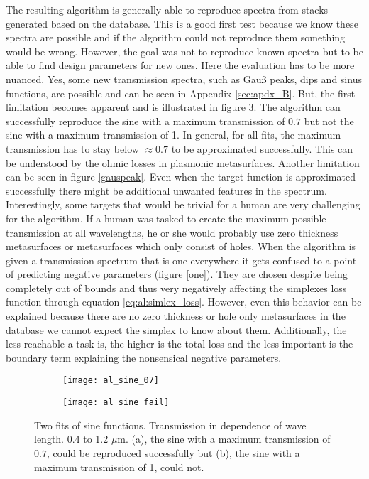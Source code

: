 The resulting algorithm is generally able to reproduce spectra from stacks generated based on the database.
This is a good first test because we know these spectra are possible and if the algorithm could not reproduce them something would be wrong. However, the goal was not to reproduce known spectra but to be able to find design parameters for new ones. Here the evaluation has to be more nuanced. Yes, some new transmission spectra, such as Gauß peaks, dips and sinus functions, are possible and can be seen in Appendix \ref{sec:apdx_B}.
But, the first limitation becomes apparent and is illustrated in figure \ref{fig:al:sine}.
The algorithm can successfully reproduce the sine with a maximum transmission of $0.7$ but not the sine with a maximum transmission of 1.
In general, for all fits, the maximum transmission has to stay below $\approx 0.7$ to be approximated successfully. This can be understood by the ohmic losses in plasmonic metasurfaces. Another limitation can be seen in figure \ref{gauspeak}. Even when the target function is approximated successfully there might be additional unwanted features in the spectrum. 
\\

\indent
Interestingly, some targets that would be trivial for a human are very challenging for the algorithm. If a human was tasked to create the maximum possible transmission at all wavelengths, he or she would probably use zero thickness metasurfaces or metasurfaces which only consist of holes. When the algorithm is given a transmission spectrum that is one everywhere it gets confused to a point of predicting negative parameters (figure \ref{one}).
They are chosen despite being completely out of bounds and thus very negatively affecting the simplexes loss function through equation \eqref{eq:al:simlex_loss}.
However, even this behavior can be explained because there are no zero thickness or hole only metasurfaces in the database we cannot expect the simplex to know about them.
Additionally, the less reachable a task is, the higher is the total loss and the less important is the boundary term explaining the nonsensical negative parameters.

\begin{figure}[H]
\centering
\begin{subfigure}{.5\textwidth}
    \centering
    \texttt{[image: al\_sine\_07]}
    \caption{}
    \label{fig:al:sine_succ}
\end{subfigure}%
\begin{subfigure}{.5\textwidth}
    \centering
    \texttt{[image: al\_sine\_fail]}
    \caption{}
    \label{fig:al:sine_fail}
\end{subfigure}
\caption{Two fits of sine functions. Transmission in dependence of wave length. 0.4 to 1.2 $\mu$m. (a), the sine with a maximum transmission of $0.7$, could be reproduced successfully but (b), the sine with a maximum transmission of 1, could not.}
\label{fig:al:sine}
\end{figure}